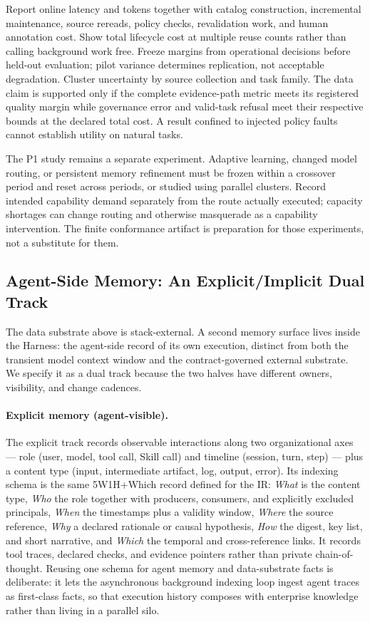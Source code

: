 \documentclass[11pt]{article}
\begin{document}
Report online latency and tokens together with catalog construction, incremental maintenance, source rereads, policy checks, revalidation work, and human annotation cost. Show total lifecycle cost at multiple reuse counts rather than calling background work free. Freeze margins from operational decisions before held-out evaluation; pilot variance determines replication, not acceptable degradation. Cluster uncertainty by source collection and task family. The data claim is supported only if the complete evidence-path metric meets its registered quality margin while governance error and valid-task refusal meet their respective bounds at the declared total cost. A result confined to injected policy faults cannot establish utility on natural tasks.

The P1 study remains a separate experiment. Adaptive learning, changed model routing, or persistent memory refinement must be frozen within a crossover period and reset across periods, or studied using parallel clusters. Record intended capability demand separately from the route actually executed; capacity shortages can change routing and otherwise masquerade as a capability intervention. The finite conformance artifact is preparation for those experiments, not a substitute for them.

\subsection{Agent-Side Memory: An Explicit/Implicit Dual Track}
\label{sec:memory-dualtrack}

The data substrate above is stack-external. A second memory surface lives inside the Harness: the agent-side record of its own execution, distinct from both the transient model context window and the contract-governed external substrate. We specify it as a dual track because the two halves have different owners, visibility, and change cadences.

\paragraph{Explicit memory (agent-visible).}
The explicit track records observable interactions along two organizational axes --- role (user, model, tool call, Skill call) and timeline (session, turn, step) --- plus a content type (input, intermediate artifact, log, output, error). Its indexing schema is the same 5W1H+Which record defined for the IR: \textit{What} is the content type, \textit{Who} the role together with producers, consumers, and explicitly excluded principals, \textit{When} the timestamps plus a validity window, \textit{Where} the source reference, \textit{Why} a declared rationale or causal hypothesis, \textit{How} the digest, key list, and short narrative, and \textit{Which} the temporal and cross-reference links. It records tool traces, declared checks, and evidence pointers rather than private chain-of-thought. Reusing one schema for agent memory and data-substrate facts is deliberate: it lets the asynchronous background indexing loop ingest agent traces as first-class facts, so that execution history composes with enterprise knowledge rather than living in a parallel silo.
\end{document}
